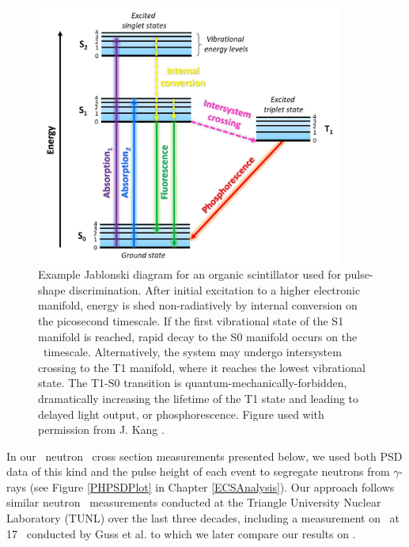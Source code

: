 \begin{figure}[tb]
    \centering
    \includegraphics[width = 0.9\textwidth]{figures/JablonskiExample_KangDissertation.png}
    \caption[Example Jablonski diagram for organic scintillator]
    {
        Example Jablonski diagram for an organic scintillator used for
        pulse-shape discrimination. After initial excitation to a higher
        electronic manifold, energy is shed non-radiatively by internal
        conversion on the picosecond timescale. If the first vibrational state of the S1
        manifold is reached, rapid decay to the S0 manifold occurs on the
        \nano\second\ timescale. Alternatively, the system may undergo intersystem
        crossing to the T1 manifold, where it reaches the lowest vibrational
        state. The T1-S0 transition is quantum-mechanically-forbidden,
        dramatically increasing the lifetime of the T1 state and leading to
        delayed light output, or phosphorescence. Figure used with permission 
        from J. Kang \cite{KangPhDThesis}. 
    }
    \label{JablonskiExample}
\end{figure}

In our \snTwelveFour\ neutron \el\ cross section measurements presented below,
we used both \gls{PSD} data of this kind and the pulse height of each
event to segregate neutrons from $\gamma$-rays (see Figure \ref{PHPSDPlot} in Chapter
\ref{ECSAnalysis}). Our approach follows similar neutron \el\ measurements
conducted at the Triangle University Nuclear Laboratory (\gls{TUNL}) over the last three decades,
including a measurement on \snTwenty\ at 17 \mega\electronvolt\ conducted by Guss et al.
\cite{Guss1989, GussPhDThesis} to which we later compare our results on
\snTwelveFour.


